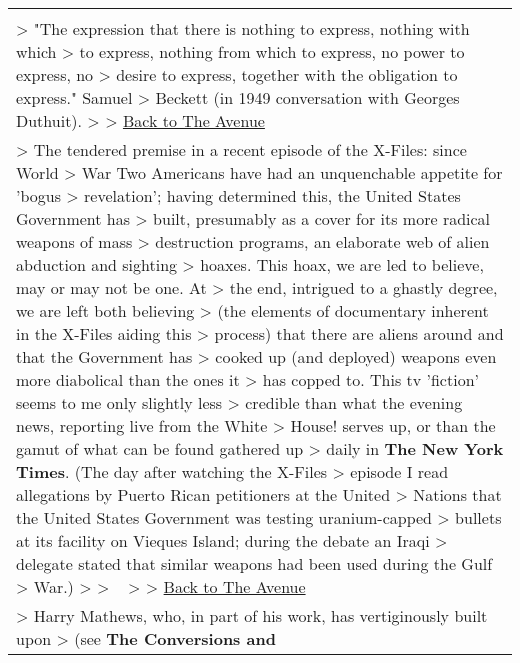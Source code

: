 \begin{longtable}[]{@{}l@{}}
\begin{minipage}[t]{0.97\columnwidth}
\end{minipage}\tabularnewline
\begin{minipage}[t]{0.97\columnwidth}\raggedright
\textgreater{} "The expression that there is nothing to express, nothing
with which \textgreater{} to express, nothing from which to express, no
power to express, no \textgreater{} desire to express, together with the
obligation to express." Samuel \textgreater{} Beckett (in 1949
conversation with Georges Duthuit). \textgreater{} \textgreater{}
\href{hunt.html}{Back to The Avenue}\strut
\end{minipage}\tabularnewline
\begin{minipage}[t]{0.97\columnwidth}\raggedright
\textgreater{} The tendered premise in a recent episode of the X-Files:
since World \textgreater{} War Two Americans have had an unquenchable
appetite for 'bogus \textgreater{} revelation'; having determined this,
the United States Government has \textgreater{} built, presumably as a
cover for its more radical weapons of mass \textgreater{} destruction
programs, an elaborate web of alien abduction and sighting
\textgreater{} hoaxes. This hoax, we are led to believe, may or may not
be one. At \textgreater{} the end, intrigued to a ghastly degree, we are
left both believing \textgreater{} (the elements of documentary inherent
in the X-Files aiding this \textgreater{} process) that there are aliens
around and that the Government has \textgreater{} cooked up (and
deployed) weapons even more diabolical than the ones it \textgreater{}
has copped to. This tv 'fiction' seems to me only slightly less
\textgreater{} credible than what the evening news, reporting live from
the White \textgreater{} House! serves up, or than the gamut of what can
be found gathered up \textgreater{} daily in \textbf{The New York
Times}. (The day after watching the X-Files \textgreater{} episode I
read allegations by Puerto Rican petitioners at the United
\textgreater{} Nations that the United States Government was testing
uranium-capped \textgreater{} bullets at its facility on Vieques Island;
during the debate an Iraqi \textgreater{} delegate stated that similar
weapons had been used during the Gulf \textgreater{} War.)
\textgreater{} \textgreater{} ~ \textgreater{} \textgreater{}
\href{hunt.html}{Back to The Avenue}\strut
\end{minipage}\tabularnewline
\begin{minipage}[t]{0.97\columnwidth}\raggedright
\textgreater{} Harry Mathews, who, in part of his work, has
vertiginously built upon \textgreater{} (see \textbf{The Conversions and
}
\end{minipage}
\end{longtable}
